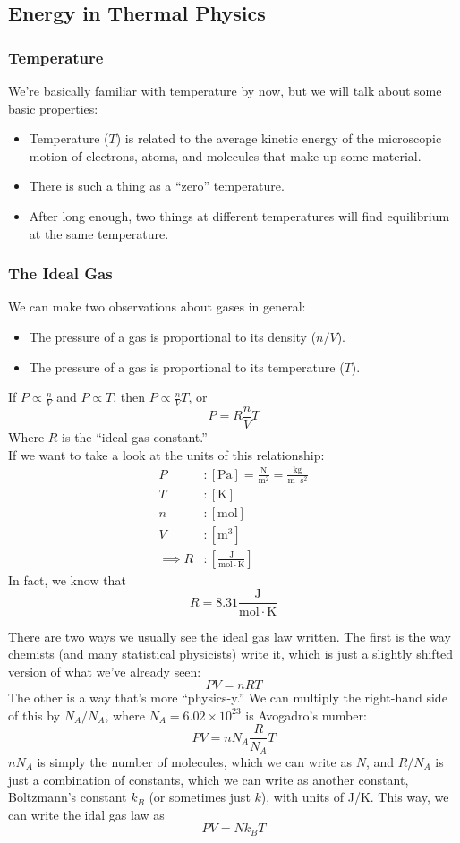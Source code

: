 \documentclass[a4paper]{article}
\begin{document}
\subsection{Energy in Thermal Physics}
\subsubsection{Temperature}
We're basically familiar with temperature by now, but we will talk about some
basic properties:
\begin{itemize}
	\item Temperature ($T$) is related to the average kinetic energy of
		the microscopic motion of electrons, atoms, and molecules that
		make up some material.
	\item There is such a thing as a ``zero'' temperature.
	\item After long enough, two things at different temperatures will
		find equilibrium at the same temperature.
\end{itemize}

\subsubsection{The Ideal Gas}
We can make two observations about gases in general:
\begin{itemize}
	\item The pressure of a gas is proportional to its density ($n/V$).
	\item The pressure of a gas is proportional to its temperature ($T$).
\end{itemize}
If $P \propto \frac{n}{V}$ and $P \propto T$, then $P \propto\frac{n}{V}T$, or
\[ P = R\frac{n}{V}T \]
Where $R$ is the ``ideal gas constant.''\\
If we want to take a look at the units of this relationship:
\begin{align*}
	P &: [\mathrm{Pa}] = \frac{\mathrm{N}}{\mathrm{m}^2}
		= \frac{\mathrm{kg}}{\mathrm{m\cdot s}^2}\\
	T &: [\mathrm{K}]\\
	n &: [\mathrm{mol}]\\
	V &: [\mathrm{m}^3]\\
	\implies
	R &: \left[\frac{\mathrm{J}}{\mathrm{mol\cdot K}}\right]
\end{align*}
In fact, we know that
\[ R = 8.31 \frac{\mathrm{J}}{\mathrm{mol\cdot K}} \]

There are two ways we usually see the ideal gas law written. The first is the
way chemists (and many statistical physicists) write it, which is just a
slightly shifted version of what we've already seen:
\[ PV = nRT \]
The other is a way that's more ``physics-y.'' We can multiply the right-hand
side of this by $N_A/N_A$, where $N_A = 6.02\times10^{23}$ is Avogadro's
number:
\[ PV = nN_A\frac{R}{N_A}T \]
$nN_A$ is simply the number of molecules, which we can write as $N$, and
$R/N_A$ is just a combination of constants, which we can write as another
constant, Boltzmann's constant $k_B$ (or sometimes just $k$), with units of
J/K. This way, we can write the idal gas law as
\[ PV = Nk_B T \]
\end{document}
